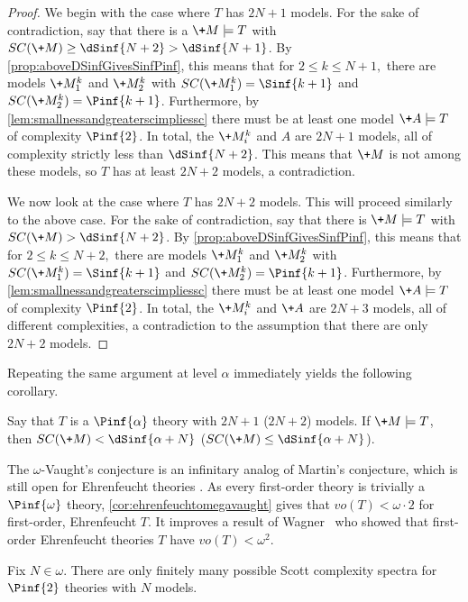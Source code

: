 \documentclass{amsart}
\renewcommand{\-}{\text{-}}
\begin{document}
\begin{proof}
We begin with the case where $T$ has $2N+1$ models.
For the sake of contradiction, say that there is a $\+M\models T$ with $SC(\+M)\geq\dSinf{N+2}>\dSinf{N+1}$.
By \cref{prop:aboveDSinfGivesSinfPinf}, this means that for $2\leq k\leq N+1,$ there are models $\+M^k_1$ and $\+M^k_2$ with $SC(\+M^k_1)=\Sinf{k+1}$ and $SC(\+M^k_2)=\Pinf{k+1}$.
Furthermore, by \cref{lem:smallnessandgreaterscimpliessc} there must be at least one model $\+A\models T$ of complexity $\Pinf{2}$.
In total, the $\+M^k_i$ and $A$ are $2N+1$ models, all of complexity strictly less than $\dSinf{N+2}$.
This means that $\+M$ is not among these models, so $T$ has at least $2N+2$ models, a contradiction.

We now look at the case where $T$ has $2N+2$ models.
This will proceed similarly to the above case.
For the sake of contradiction, say that there is $\+M\models T$ with $SC(\+M)>\dSinf{N+2}$.
By \cref{prop:aboveDSinfGivesSinfPinf}, this means that for $2\leq k\leq N+2,$ there are models $\+M^k_1$ and $\+M^k_2$ with $SC(\+M^k_1)=\Sinf{k+1}$ and $SC(\+M^k_2)=\Pinf{k+1}$.
Furthermore, by \cref{lem:smallnessandgreaterscimpliessc} there must be at least one model $\+A\models T$ of complexity $\Pinf{2}$.
In total, the $\+M^k_i$ and $\+A$ are $2N+3$ models, all of different complexities, a contradiction to the assumption that there are only $2N+2$ models.
\end{proof}

Repeating the same argument at level $\alpha$ immediately yields the following corollary.

\begin{corollary}
Say that $T$ is a $\Pinf{\alpha}$ theory with $2N+1$ ($2N+2$) models.
If $\+M\models T$, then $SC(\+M)<\dSinf{\alpha+N}$ ($SC(\+M)\leq\dSinf{\alpha+N}$).
\end{corollary}
\ehrenfeuchtomegavaught

The $\omega$-Vaught's conjecture is an infinitary analog of Martin's conjecture, which is still open for Ehrenfeucht theories \cite[Problem 7]{PT25}. As every first-order theory is trivially a $\Pinf{\omega}$ theory, \cref{cor:ehrenfeuchtomegavaught} gives that $vo(T)<\omega\cdot2$ for first-order, Ehrenfeucht $T$. It improves a result of Wagner~\cite{Wag82} who showed that first-order Ehrenfeucht theories $T$ have $vo(T)<\omega^2$.

\begin{corollary}
Fix $N\in\omega$. There are only finitely many possible Scott complexity spectra for $\Pinf{2}$ theories with $N$ models.
\end{corollary}
\end{document}
